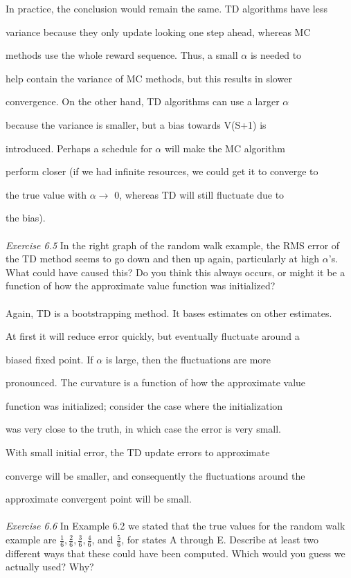 \documentclass{article}
\begin{document}
In practice, the conclusion would remain the same. TD algorithms have less 

variance because they only update looking one step ahead, whereas MC 

methods use the whole reward sequence. Thus, a small $\alpha$ is needed to 

help contain the variance of MC methods, but this results in slower 

convergence. On the other hand, TD algorithms can use a larger $\alpha$ 

because the variance is smaller, but a bias towards V(S+1) is 

introduced. Perhaps a schedule for $\alpha$ will make the MC algorithm 

perform closer (if we had infinite resources, we could get it to converge to 

the true value with $\alpha \rightarrow$ 0, whereas TD will still fluctuate due to 

the bias).
\\\\
\textit{Exercise 6.5} In the right graph of the random walk example, the RMS error of the
TD method seems to go down and then up again, particularly at high $\alpha$’s. What could
have caused this? Do you think this always occurs, or might it be a function of how the
approximate value function was initialized?   
\\
\\

Again, TD is a bootstrapping method. It bases estimates on other estimates. 

At first it will reduce error quickly, but eventually fluctuate around a 

biased fixed point. If $\alpha$ is large, then the fluctuations are more 

pronounced. The curvature is a function of how the approximate value 

function was initialized; consider the case where the initialization 

was very close to the truth, in which case the error is very small. 

With small initial error, the TD update errors to approximate 

converge will be smaller, and consequently the fluctuations around the 

approximate convergent point will be small.
\\\\
\textit{Exercise 6.6} In Example 6.2 we stated that the true values for the random walk example
are $\frac{1}{6}, \frac{2}{6}, \frac{3}{6}, \frac{4}{6}$, and $\frac{5}{6}$, for states A through E. Describe at least two different ways that these could have been computed. Which would you guess we actually used? Why?  
\\
\\
\end{document}
